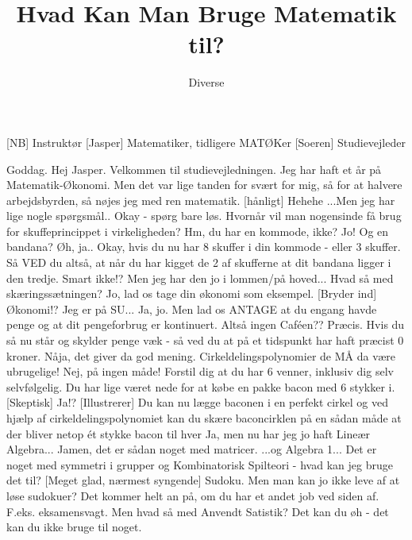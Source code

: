 \documentclass{article}
\title{Hvad Kan Man Bruge Matematik til?}
\author{Diverse}
\begin{document}
\maketitle

\begin{roles}
[NB] Instruktør
[Jasper] Matematiker, tidligere MATØKer
[Soeren] Studievejleder
\end{roles}

\begin{sketch}
 Goddag.
 Hej Jasper. Velkommen til studievejledningen. 
 Jeg har haft et år på Matematik-Økonomi. Men det var lige tanden for svært for mig, så for at halvere arbejdsbyrden, så nøjes jeg med ren matematik.
[hånligt] Hehehe 
 ...Men jeg har lige nogle spørgsmål..
 Okay - spørg bare løs.
 Hvornår vil man nogensinde få brug for skuffeprincippet i virkeligheden?
 Hm, du har en kommode, ikke?
 Jo!
 Og en bandana?
 Øh, ja..
 Okay, hvis du nu har 8 skuffer i din kommode - eller 3 skuffer. Så VED du altså, at når du har kigget de 2 af skufferne at dit bandana ligger i den tredje. Smart ikke!?
 Men jeg har den jo i lommen/på hoved... Hvad så med skæringssætningen?
 Jo, lad os tage din økonomi som eksempel.
[Bryder ind] Økonomi!? Jeg er på SU...
 Ja, jo. Men lad os ANTAGE at du engang havde penge og at dit
pengeforbrug er kontinuert.
 Altså ingen Caféen??
 Præcis. Hvis du så nu står og skylder penge væk - så ved du at
på et tidspunkt har haft præcist 0 kroner.
 Nåja, det giver da god mening. Cirkeldelingspolynomier de MÅ da
være ubrugelige!
 Nej, på ingen måde! Forstil dig at du har 6 venner, inklusiv
dig selv selvfølgelig. Du har lige været nede for at købe en pakke bacon med 6 stykker i.
[Skeptisk] Ja!?
[Illustrerer] Du kan nu lægge baconen i en perfekt cirkel og ved hjælp af
cirkeldelingspolynomiet kan du skære baconcirklen på en sådan måde at
der bliver netop ét stykke bacon til hver
 Ja, men nu har jeg jo haft Lineær Algebra...
 Jamen, det er sådan noget med matricer.
 ...og Algebra 1... 
 Det er noget med symmetri i grupper 
   og Kombinatorisk Spilteori - hvad kan jeg bruge det til?
[Meget glad, nærmest syngende] Sudoku.
 Men man kan jo ikke leve af at løse sudokuer?
 Det kommer helt an på, om du har et andet job ved siden af. F.eks. eksamensvagt.
 Men hvad så med Anvendt Satistik?
 Det kan du øh - det kan du ikke bruge til noget.

\end{sketch}
\end{document}
